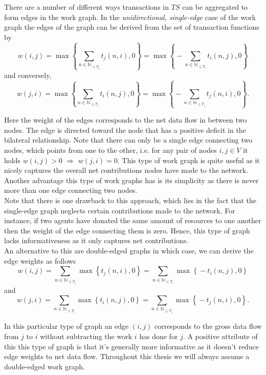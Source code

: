 \noindent{}There are a number of different ways transactions in $TS$ can be aggregated to form edges in the work graph. In the {\it unidirectional, single-edge} case of the work graph the edges of the graph can be derived from the set of transaction functions by
\[
w(i,j) = \max\left\lbrace{}\sum\limits_{n\in\mathbb{N}_{\leq{}T_j}}t_j(n,i), 0\right\rbrace = \max\left\lbrace{}-\sum\limits_{n\in\mathbb{N}_{\leq{}T_i}}t_i(n,j), 0\right\rbrace
\]
and conversely, 
\[
w(j,i) = \max\left\lbrace{}\sum\limits_{n\in\mathbb{N}_{\leq{}T_i}}t_i(n,j), 0\right\rbrace = \max\left\lbrace{}-\sum\limits_{n\in\mathbb{N}_{\leq{}T_j}}t_j(n,i), 0\right\rbrace.
\]

\noindent{}Here the weight of the edges corresponds to the net data flow in between two nodes. The edge is directed toward the node that has a positive deficit in the bilateral relationship. Note that there can only be a single edge connecting two nodes, which points from one to the other, i.e. for any pair of nodes $i,j\in{}V$ it holds $w(i,j)>0\,\,\Rightarrow\,\,w(j,i)=0$. This type of work graph is quite useful as it nicely captures the overall net contributions nodes have made to the network. Another advantage this type of work graphs has is its simplicity as there is never more than one edge connecting two nodes. \vspace{1em}\\

\noindent{}Note that there is one drawback to this approach, which lies in the fact that the single-edge graph neglects certain contributions made to the network. For instance, if two agents have donated the same amount of resources to one another then the weight of the edge connecting them is zero. Hence, this type of graph lacks informativeness as it only captures net contributions.\vspace{1em}\\

\noindent{}An alternative to this are double-edged graphs in which case, we can derive the edge weights as follows
\[
w(i,j) = \sum\limits_{n\in\mathbb{N}_{\leq{}T_j}}\max\left\lbrace{}t_j(n,i), 0 \right\rbrace = \sum\limits_{n\in\mathbb{N}_{\leq{}T_i}}\max\left\lbrace{}-t_i(n,j),0\right\rbrace 
\]
\noindent{}and
\[
w(j,i) = \sum\limits_{n\in\mathbb{N}_{\leq{}T_i}}\max\left\lbrace{}t_i(n,j), 0 \right\rbrace = \sum\limits_{n\in\mathbb{N}_{\leq{}T_j}}\max\left\lbrace{}-t_j(n,i),0\right\rbrace.
\]

\noindent{}In this particular type of graph an edge $(i,j)$ corresponds to the gross data flow from $j$ to $i$ without subtracting the work $i$ has done for $j$. A positive attribute of this this type of graph is that it's generally more informative as it doesn't reduce edge weights to net data flow. Throughout this thesis we will always assume a double-edged work graph.\vspace{1em}\\

